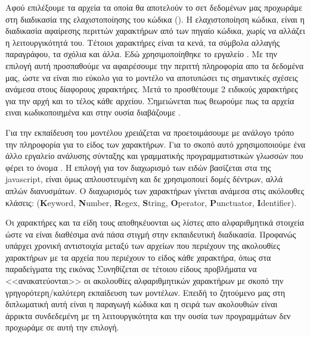 Αφού επιλέξουμε τα αρχεία τα οποία θα αποτελούν το σετ δεδομένων μας προχωράμε στη διαδικασία της ελαχιστοποίησης του κώδικα ().
Η ελαχιστοποίηση κώδικα, είναι η διαδικασία αφαίρεσης περιττών χαρακτήρων από των πηγαίο κώδικα, χωρίς να αλλάζει η λειτουργικότητά του. Τέτοιοι χαρακτήρες είναι τα κενά, τα σύμβολα αλλαγής παραγράφου, τα σχόλια και άλλα. Εδώ χρησιμοποίηθηκε το εργαλείο .
Με την επιλογή αυτή προσπαθούμε να αφαιρέσουμε την περιττή πληροφορία απο τα δεδομένα μας, ώστε να είναι πιο εύκολο για το μοντέλο να αποτυπώσει τις σημαντικές σχέσεις ανάμεσα στους δίαφορους χαρακτήρες.
Μετά το  προσθέτουμε 2 ειδικούς χαρακτήρες για την αρχή και το τέλος κάθε αρχείου. Σημειώνεται πως θεωρούμε πως τα αρχεία ειναι  κωδικοποιημένα και στην ουσία διαβάζουμε . 

Για την εκπαίδευση του μοντέλου  χρειάζεται να προετοιμάσουμε με ανάλογο τρόπο την πληροφορία για το είδος των χαρακτήρων. Για το σκοπό αυτό χρησιμοποιούμε ένα άλλο εργαλείο ανάλυσης σύνταξης και γραμματικής προγραμματιστικών γλωσσών που φέρει το όνομα .
Η επιλογή για τον διαχωρισμό των ειδών βασίζεται στα  της javascript, είναι όμως απλουστευμένη και δε χρησιμοποιεί δομές δέντρων, αλλά απλών διανυσμάτων.
Ο διαχωρισμός των χαρακτήρων γίνεται ανάμεσα στις ακόλουθες κλάσεις: (\textbf{K}eyword, \textbf{N}umber, \textbf{R}egex, \textbf{S}tring, \textbf{O}perator, \textbf{P}unctuator, \textbf{I}dentifier).

Οι χαρακτήρες και τα είδη τους αποθηκέυονται ως λίστες απο αλφαριθμητικά στοιχεία ώστε να είναι διαθέσιμα ανά πάσα στιγμή στην εκπαιδευτική διαδικασία.
Προφανώς υπάρχει χρονική αντιστοιχία μεταξύ των αρχείων που περιέχουν της ακολουθίες χαρακτήρων με τα αρχεία που περιέχουν το είδος κάθε χαρακτήρα, όπως στα παραδείγματα της εικόνας %
Συνηθίζεται σε τέτοιου είδους προβλήματα να <<ανακατεύονται>> οι ακολουθίες αλφαριθμητικών χαρακτήρων με σκοπό την γρηγορότερη/καλύτερη εκπαίδευση των μοντέλων.
Επειδή το ζητούμενο μας στη διπλωματική αυτή είναι η παραγωγή κώδικα και η σειρά των ακολουθιών είναι άρρικτα συνδεδεμένη με τη λειτουργικότητα και την ουσία των προγραμμάτων δεν προχωράμε σε αυτή την επιλογή.  


\section{}

\section{}
